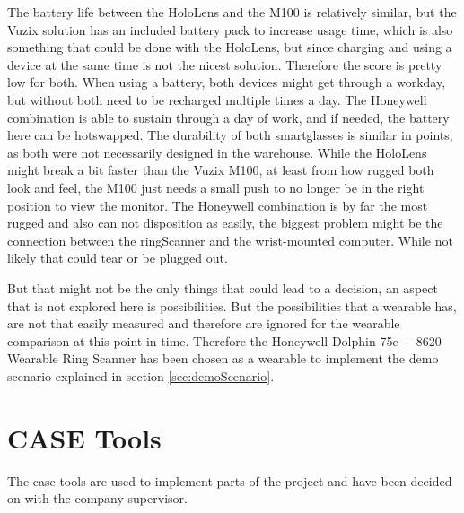 The battery life between the HoloLens and the M100 is relatively similar, but the Vuzix solution has an included battery pack to increase usage time, which is also something that could be done with the HoloLens, but since charging and using a device at the same time is not the nicest solution. Therefore the score is pretty low for both. When using a \gls{battery}, both devices might get through a workday, but without both need to be recharged multiple times a day. The Honeywell combination is able to sustain through a day of work, and if needed, the battery here can be \gls{hotswap}ped. The durability of both \gls{smartglasses} is similar in points, as both were not necessarily designed in the warehouse. While the HoloLens might break a bit faster than the Vuzix M100, at least from how rugged both look and feel, the M100 just needs a small push to no longer be in the right position to view the monitor. The Honeywell combination is by far the most rugged and also can not disposition as easily, the biggest problem might be the connection between the \gls{ringScanner} and the wrist-mounted computer. While not likely that could tear or be plugged out.

But that might not be the only things that could lead to a decision, an aspect that is not explored here is possibilities. But the possibilities that a \gls{wearable} has, are not that easily measured and therefore are ignored for the wearable comparison at this point in time. Therefore the Honeywell Dolphin 75e + 8620 Wearable Ring Scanner has been chosen as a wearable to implement the demo scenario explained in section \ref{sec:demoScenario}.

\clearpage

\section{CASE Tools}\label{sec:caseTools}
The \gls{case} tools are used to implement parts of the project and have been decided on with the company supervisor. 

